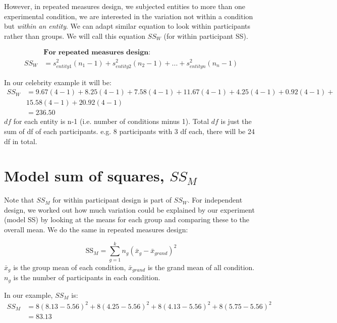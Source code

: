 However, in repeated measures design, we subjected entities to more than one experimental condition, we are interested in the variation not within a condition but \emph{within an entity}. We can adapt similar equation to look within participants rather than groups. We will call this equation $SS_W$ (for within participant SS).

\begin{equation}
\begin{split}
&\textbf{For repeated measures design}: \\
SS_W &= s^2_{entity1}(n_1 - 1) +  s^2_{entity2}(n_2 - 1) + ... +  s^2_{entity n}(n_n - 1)
\end{split}
\end{equation}

In our celebrity example it will be: 
\begin{equation*}
\begin{split}
SS_W & = 9.67(4-1) + 8.25(4-1) + 7.58(4-1) + 11.67(4-1) + 4.25(4-1) + 0.92(4-1) + \\
& 15.58(4-1) + 20.92(4-1) \\
& = 236.50
\end{split}
\end{equation*}
$df$ for each entity is n-1 (i.e. number of conditions minus 1). Total $df$ is just the sum of df of each participants. e.g. 8 participants with 3 df each, there will be 24 df in total. 

\section{Model sum of squares, $SS_M$}
Note that $SS_M$ for within participant design is part of $SS_W$. For independent design, we worked out how much variation could be explained by our experiment (model SS) by looking at the means for each group and comparing these to the overall mean. We do the same in repeated measures design:

\begin{equation}
\text{SS}_M = \sum^k_{g=1} n_g(\bar{x}_g - \bar{x}_{grand})^2
\end{equation}
$\bar{x}_g$ is the group mean of each condition, $\bar{x}_{grand}$ is the grand mean of all condition. $n_g$ is the number of participants in each condition.

In our example, $SS_M$ is:
\begin{equation*}
\begin{split}
SS_M & = 8(8.13-5.56)^2 + 8(4.25-5.56)^2 + 8(4.13-5.56)^2 + 8(5.75-5.56)^2\\
& = 83.13
\end{split}
\end{equation*}

